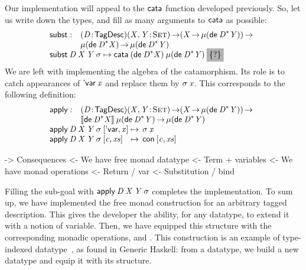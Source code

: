 Our implementation will appeal to the $\cata$ function developed
previously. So, let us write down the types, and fill as many
arguments to $\cata$ as possible:
%
\[\stk{
\begin{array}{@{}ll}
\subst : & \PITEL{\V{D}}{\TagDesc}
           \PI{\V{X}, \V{Y}}{\Set} 
           (\V{X} \To \Mu{(\toDesc{\FreeMonad{\V{D}}{\V{Y}}})}) \To \\
         & \Mu{(\toDesc{\FreeMonad{\V{D}}{\V{X}}})} \To
           \Mu{(\toDesc{\FreeMonad{\V{D}}{\V{Y}}})} 
\end{array} \\
\subst\: \V{D}\: \V{X}\: \V{Y}\: \V{\sigma} \mapsto
  \cata\: (\toDesc{\FreeMonad{\V{D}}{\V{X}}})\: 
          \Mu{(\toDesc{\FreeMonad{\V{D}}{\V{Y}}})}\: 
          \SHED
}\]
%
We are left with implementing the algebra of the catamorphism. Its
role is to catch appearances of $\DVar{\V{x}}$ and replace them by
$\V{\sigma}\: \V{x}$. This corresponds to the following definition:
%
\[\stk{
\begin{array}{@{}ll}
\apply : & \PITEL{\V{D}}{\TagDesc} 
           \PI{\V{X}, \V{Y}}{\Set} 
           (\V{X} \To \Mu{(\toDesc{\FreeMonad{\V{D}}{\V{Y}}})}) \To \\
         & \descop{\toDesc{\FreeMonad{\V{D}}{\V{X}}}}{\Mu{(\toDesc{\FreeMonad{\V{D}}{\V{Y}}})}} \To
           \Mu{(\toDesc{\FreeMonad{\V{D}}{\V{Y}}})}
\\
\end{array} \\
\begin{array}{@{}l@{\:\mapsto\:\:}l}
\apply\: \V{D}\: \V{X}\: \V{Y}\: \V{\sigma}\: \pair{\SYMBDVar}{\V{x}}{}   & \V{\sigma}\: \V{x}                   \\
\apply\: \V{D}\: \V{X}\: \V{Y}\: \V{\sigma}\: \pair{\V{c}}{\V{xs}}{} & \Con{\pair{\V{c}}{\V{xs}}{}}
\end{array}
}\]

\begin{wstructure}
    -> Consequences
        <- We have free monad datatype
            <- Term + variables
        <- We have monad operations
            <- Return / var
            <- Substitution / bind
\end{wstructure}

Filling the sub-goal with $\apply\: \V{D}\: \V{X}\: \V{Y}\:
\V{\sigma}$ completes the implementation. To sum up, we have
implemented the free monad construction for an arbitrary tagged
description. This gives the developer the ability, for any datatype,
to extend it with a notion of variable. Then, we have equipped this
structure with the corresponding monadic operations, \bind and
\return. This construction is an example of type-indexed
datatype~\cite{hinze:generic-haskell}, as found in Generic Haskell:
from a datatype, we build a new datatype and equip it with its
structure.

